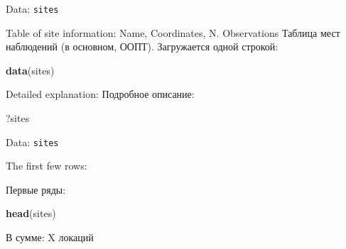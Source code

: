 \documentclass[9pt,ignorenonframetext,aspectratio=169]{beamer}
\newenvironment{Shaded}{\begin{snugshade}}{\end{snugshade}}
\newcommand{\KeywordTok}[1]{\textcolor[rgb]{0.13,0.29,0.53}{\textbf{#1}}}
\newcommand{\NormalTok}[1]{#1}
\begin{document}
\begin{frame}[fragile]{Data: \texttt{sites}}
\protect\hypertarget{data-sites}{}

\bcols
{}

Table of site information: Name, Coordinates, N. Observations 
Таблица мест наблюдений (в основном, ООПТ). Загружается одной строкой:
\ecols

\begin{Shaded}
\begin{Highlighting}[]
\KeywordTok{data}\NormalTok{(sites)}
\end{Highlighting}
\end{Shaded}

\bcols
{}

Detailed explanation:  Подробное описание: \ecols

\begin{Shaded}
\begin{Highlighting}[]
\NormalTok{?sites}
\end{Highlighting}
\end{Shaded}

\end{frame}

\begin{frame}[fragile]{Data: \texttt{sites}}
\protect\hypertarget{data-sites-1}{}

\bcols
{}

The first few rows:


Первые ряды: \ecols

\scriptsize

\begin{Shaded}
\begin{Highlighting}[]
\KeywordTok{head}\NormalTok{(sites)}
\end{Highlighting}
\end{Shaded}

\normalsize В сумме: X локаций

\end{frame}
\end{document}
